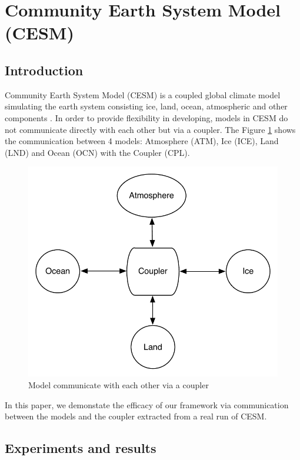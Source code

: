 \section{Community Earth System Model (CESM)}
\label{sec:cesm}

\subsection{Introduction}

Community Earth System Model (CESM) is a coupled global climate model simulating the earth system consisting ice, land, ocean, atmospheric and other components \cite{CESM:Hurrell}. In order to provide flexibility in developing, models in CESM do not communicate directly with each other but via a coupler. The Figure \ref{fig:mct} shows the communication between 4 models: Atmosphere (ATM), Ice (ICE), Land (LND) and Ocean (OCN) with the Coupler (CPL).

\begin{figure}[!htb]
\vspace{-0.1in}
\centering
\includegraphics[scale=0.5]{figures/mct.pdf}
\vspace{-0.1in}
\caption{Model communicate with each other via a coupler}
\vspace{-0.1in}
\label{fig:mct}
\end{figure}

In this paper, we demonstate the efficacy of our framework via communication between the models and the coupler extracted from a real run of CESM.

\subsection{Experiments and results}




